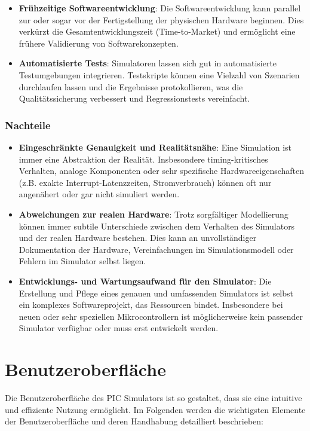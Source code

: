 \begin{itemize}
    \item \textbf{Frühzeitige Softwareentwicklung}: Die Softwareentwicklung kann parallel zur oder sogar vor der Fertigstellung der physischen Hardware beginnen. Dies verkürzt die Gesamtentwicklungszeit (Time-to-Market) und ermöglicht eine frühere Validierung von Softwarekonzepten.
    \item \textbf{Automatisierte Tests}: Simulatoren lassen sich gut in automatisierte Testumgebungen integrieren. Testskripte können eine Vielzahl von Szenarien durchlaufen lassen und die Ergebnisse protokollieren, was die Qualitätssicherung verbessert und Regressionstests vereinfacht.
\end{itemize}

\subsection*{Nachteile}
\begin{itemize}
    \item \textbf{Eingeschränkte Genauigkeit und Realitätsnähe}: Eine Simulation ist immer eine Abstraktion der Realität. Insbesondere timing-kritisches Verhalten, analoge Komponenten oder sehr spezifische Hardwareeigenschaften (z.B. exakte Interrupt-Latenzzeiten, Stromverbrauch) können oft nur angenähert oder gar nicht simuliert werden. 
    \item \textbf{Abweichungen zur realen Hardware}: Trotz sorgfältiger Modellierung können immer subtile Unterschiede zwischen dem Verhalten des Simulators und der realen Hardware bestehen. Dies kann an unvollständiger Dokumentation der Hardware, Vereinfachungen im Simulationsmodell oder Fehlern im Simulator selbst liegen. 
    \item \textbf{Entwicklungs- und Wartungsaufwand für den Simulator}: Die Erstellung und Pflege eines genauen und umfassenden Simulators ist selbst ein komplexes Softwareprojekt, das Ressourcen bindet. Insbesondere bei neuen oder sehr speziellen Mikrocontrollern ist möglicherweise kein passender Simulator verfügbar oder muss erst entwickelt werden.
\end{itemize}
 
\chapter{Benutzeroberfläche}

Die Benutzeroberfläche des PIC Simulators ist so gestaltet, dass sie eine intuitive und effiziente Nutzung ermöglicht. Im Folgenden werden die wichtigsten Elemente der Benutzeroberfläche und deren Handhabung detailliert beschrieben:

